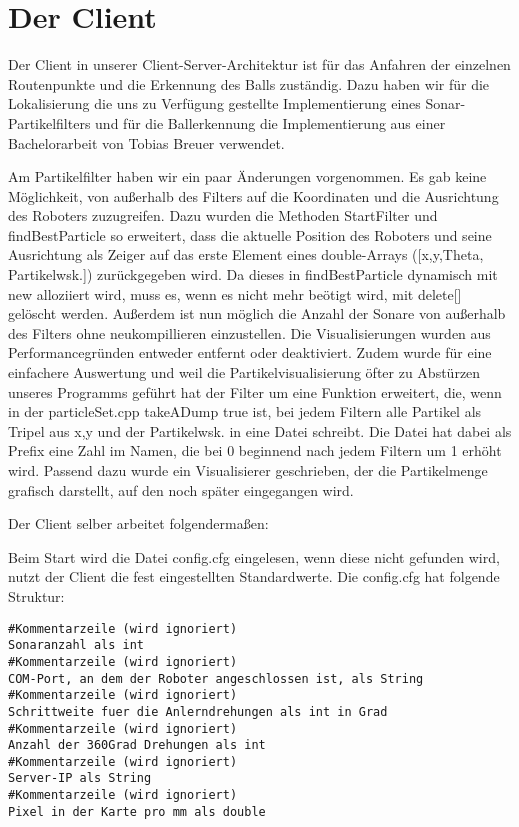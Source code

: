 \chapter{Der Client}
Der Client in unserer Client-Server-Architektur ist für das Anfahren der
einzelnen Routenpunkte und die Erkennung des Balls zuständig. Dazu haben
wir für die Lokalisierung die uns zu Verfügung gestellte Implementierung
eines Sonar-Partikelfilters und für die Ballerkennung die Implementierung
aus einer Bachelorarbeit von Tobias Breuer verwendet.

Am Partikelfilter haben wir ein paar Änderungen vorgenommen. Es gab keine
Möglichkeit, von außerhalb des Filters auf die Koordinaten und die
Ausrichtung des Roboters zuzugreifen. Dazu wurden die Methoden StartFilter
und findBestParticle so erweitert, dass die aktuelle Position des Roboters
und seine Ausrichtung als Zeiger auf das erste Element eines double-Arrays
([x,y,Theta, Partikelwsk.]) zurückgegeben wird. Da dieses in
findBestParticle dynamisch mit new alloziiert wird, muss es, wenn es nicht
mehr beötigt wird, mit delete[] gelöscht werden. Außerdem ist nun möglich
die Anzahl der Sonare von außerhalb des Filters ohne neukompillieren
einzustellen. Die Visualisierungen wurden aus Performancegründen entweder
entfernt oder deaktiviert. Zudem wurde für eine einfachere Auswertung und
weil die Partikelvisualisierung öfter zu Abstürzen unseres Programms
geführt hat der Filter um eine Funktion erweitert, die, wenn in der
particleSet.cpp takeADump true ist, bei jedem Filtern alle Partikel als
Tripel aus x,y und der Partikelwsk. in eine Datei schreibt. Die Datei hat
dabei als Prefix eine Zahl im Namen, die bei 0 beginnend nach jedem Filtern
 um 1 erhöht wird. Passend dazu wurde ein Visualisierer geschrieben, der
die Partikelmenge grafisch darstellt, auf den noch später eingegangen wird.

Der Client selber arbeitet folgendermaßen:

Beim Start wird die Datei config.cfg eingelesen, wenn diese nicht gefunden
wird, nutzt der Client die fest eingestellten Standardwerte. Die config.cfg
hat folgende Struktur:

\begin{lstlisting}
#Kommentarzeile (wird ignoriert)
Sonaranzahl als int
#Kommentarzeile (wird ignoriert)
COM-Port, an dem der Roboter angeschlossen ist, als String
#Kommentarzeile (wird ignoriert)
Schrittweite fuer die Anlerndrehungen als int in Grad
#Kommentarzeile (wird ignoriert)
Anzahl der 360Grad Drehungen als int
#Kommentarzeile (wird ignoriert)
Server-IP als String
#Kommentarzeile (wird ignoriert)
Pixel in der Karte pro mm als double
\end{lstlisting}

